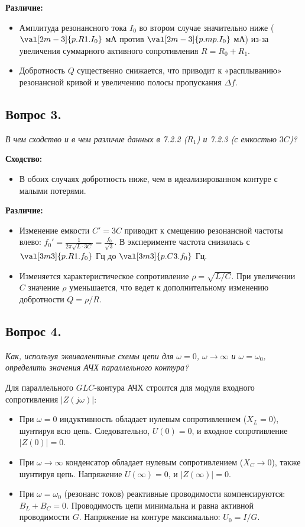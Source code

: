 \textbf{Различие:}
\begin{itemize}
    \item Амплитуда резонансного тока $I_0$ во втором случае значительно ниже ($\val[2m-3]{p.R1.I_0}$ мА против $\val[2m-3]{p.mp.I_0}$ мА) из-за увеличения суммарного активного сопротивления $R = R_0 + R_1$.
    \item Добротность $Q$ существенно снижается, что приводит к «расплыванию» резонансной кривой и увеличению полосы пропускания $\Delta f$.
\end{itemize}

\subsection*{Вопрос 3.}
\textit{В чем сходство и в чем различие данных в 7.2.2 ($R_1$) и 7.2.3 (с емкостью $3C$)?}

\textbf{Сходство:}
\begin{itemize}
    \item В обоих случаях добротность ниже, чем в идеализированном контуре с малыми потерями.
\end{itemize}

\textbf{Различие:}
\begin{itemize}
    \item Изменение емкости $C' = 3C$ приводит к смещению резонансной частоты влево: $f_0' = \frac{1}{2\pi\sqrt{L \cdot 3C}} = \frac{f_0}{\sqrt{3}}$. В эксперименте частота снизилась с $\val[3m3]{p.R1.f_0}$ Гц до $\val[3m3]{p.C3.f_0}$ Гц.
    \item Изменяется характеристическое сопротивление $\rho = \sqrt{L/C}$. При увеличении $C$ значение $\rho$ уменьшается, что ведет к дополнительному изменению добротности $Q = \rho/R$.
\end{itemize}

\subsection*{Вопрос 4.}
\textit{Как, используя эквивалентные схемы цепи для $\omega = 0$, $\omega \to \infty$ и $\omega = \omega_0$, определить значения АЧХ параллельного контура?}

Для параллельного $GLC$-контура АЧХ строится для модуля входного сопротивления $|Z(j\omega)|$:
\begin{itemize}
    \item При $\omega = 0$ индуктивность обладает нулевым сопротивлением ($X_L = 0$), шунтируя всю цепь. Следовательно, $U(0) = 0$, и входное сопротивление $|Z(0)| = 0$.
    \item При $\omega \to \infty$ конденсатор обладает нулевым сопротивлением ($X_C \to 0$), также шунтируя цепь. Напряжение $U(\infty) = 0$, и $|Z(\infty)| = 0$.
    \item При $\omega = \omega_0$ (резонанс токов) реактивные проводимости компенсируются: $B_L + B_C = 0$. Проводимость цепи минимальна и равна активной проводимости $G$. Напряжение на контуре максимально: $U_0 = I/G$.
\end{itemize}

